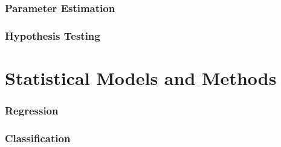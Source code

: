 \documentclass{article}
\begin{document}
\section{Parameter Estimation}
\section{Hypothesis Testing}

\newpage
\part{Statistical Models and Methods}
\section{Regression}
\section{Classification}

    
\end{document}
